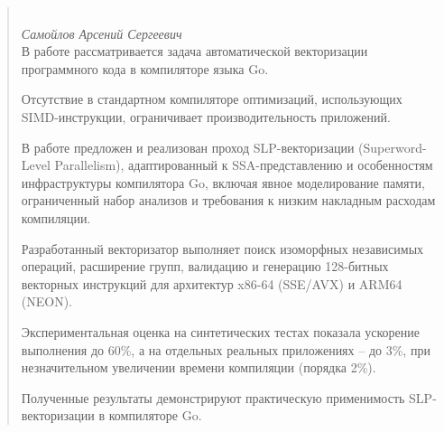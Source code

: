 \begin{abstract}

\begin{center}
    \large{} \\
    \large\textit{Самойлов Арсений Сергеевич} \\[1 cm]

    В работе рассматривается задача автоматической векторизации программного кода в компиляторе языка Go. 

    Отсутствие в стандартном компиляторе оптимизаций, использующих SIMD-инструкции, 
    ограничивает производительность приложений. 
    
    В работе предложен и реализован проход SLP-векторизации (Superword-Level Parallelism), адаптированный 
    к SSA-представлению и особенностям инфраструктуры компилятора Go, включая явное моделирование памяти, 
    ограниченный набор анализов и требования к низким накладным расходам компиляции.
    
    Разработанный векторизатор выполняет поиск изоморфных независимых операций, расширение групп, валидацию и 
    генерацию 128-битных векторных инструкций для архитектур x86-64 (SSE/AVX) и ARM64 (NEON).

    Экспериментальная оценка на синтетических тестах показала ускорение выполнения до 60\%, 
    а на отдельных реальных приложениях -- до 3\%, при незначительном увеличении времени компиляции (порядка 2\%). 

    Полученные результаты демонстрируют практическую применимость SLP-векторизации в компиляторе Go.
    \vfill
\end{center}

\end{abstract}